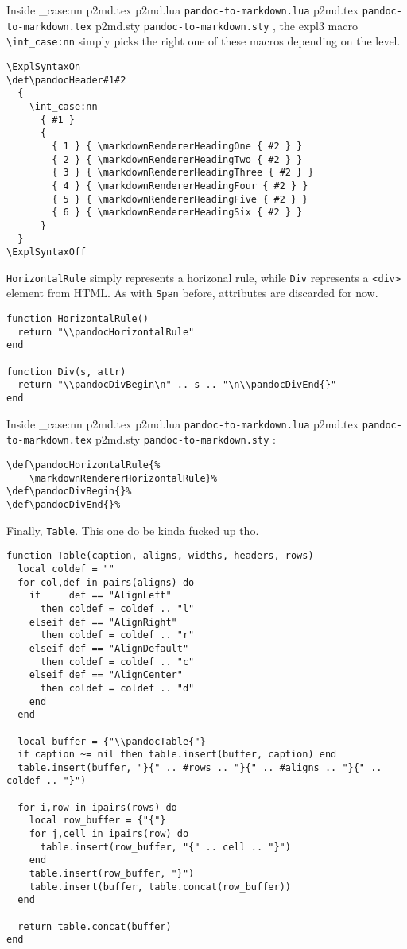 \documentclass[
  digital,     %
  oneside,     %
  nosansbold,  %
  nocolorbold, %
  lof,         %
  nolot,       %
]{fithesis4}
\newcommand\macro[1]{\texttt{\textbackslash{}{#1}}}
\newcommand\file[1]
  {
    \str_case:nn
      { #1 }
      {
        { p2md.lua } { \texttt{pandoc\hyp{}to\hyp{}markdown.lua} }
        { p2md.tex } { \texttt{pandoc\hyp{}to\hyp{}markdown.tex} }
        { p2md.sty } { \texttt{pandoc\hyp{}to\hyp{}markdown.sty} }
      }
  }
\begin{document}
\noindent
Inside \file{p2md.tex}, the expl3 macro \macro{int\_case:nn} simply picks the right one of these macros depending on the level.

\noindent
\lstset{language=[plain]TeX}
\begin{lstlisting}
\ExplSyntaxOn
\def\pandocHeader#1#2
  {
    \int_case:nn
      { #1 }
      {
        { 1 } { \markdownRendererHeadingOne { #2 } }
        { 2 } { \markdownRendererHeadingTwo { #2 } }
        { 3 } { \markdownRendererHeadingThree { #2 } }
        { 4 } { \markdownRendererHeadingFour { #2 } }
        { 5 } { \markdownRendererHeadingFive { #2 } }
        { 6 } { \markdownRendererHeadingSix { #2 } }
      }
  }
\ExplSyntaxOff
\end{lstlisting}

\noindent
\texttt{HorizontalRule} simply represents a horizonal rule, while \texttt{Div} represents a \texttt{<div>} element from HTML. As with \texttt{Span} before, attributes are discarded for now.

\noindent
\lstset{language=[5.3]Lua}
\begin{lstlisting}
function HorizontalRule()
  return "\\pandocHorizontalRule"
end

function Div(s, attr)
  return "\\pandocDivBegin\n" .. s .. "\n\\pandocDivEnd{}"
end
\end{lstlisting}

\noindent
Inside \file{p2md.tex}:

\noindent
\lstset{language=[plain]TeX}
\begin{lstlisting}
\def\pandocHorizontalRule{%
    \markdownRendererHorizontalRule}%
\def\pandocDivBegin{}%
\def\pandocDivEnd{}%
\end{lstlisting}

\noindent
Finally, \texttt{Table}. This one do be kinda fucked up tho.

\noindent
\lstset{language=[5.3]Lua}
\begin{lstlisting}
function Table(caption, aligns, widths, headers, rows)
  local coldef = ""
  for col,def in pairs(aligns) do
    if     def == "AlignLeft"
      then coldef = coldef .. "l"
    elseif def == "AlignRight"
      then coldef = coldef .. "r"
    elseif def == "AlignDefault"
      then coldef = coldef .. "c"
    elseif def == "AlignCenter"
      then coldef = coldef .. "d"
    end
  end

  local buffer = {"\\pandocTable{"}
  if caption ~= nil then table.insert(buffer, caption) end
  table.insert(buffer, "}{" .. #rows .. "}{" .. #aligns .. "}{" .. coldef .. "}")

  for i,row in ipairs(rows) do
    local row_buffer = {"{"}
    for j,cell in ipairs(row) do
      table.insert(row_buffer, "{" .. cell .. "}")
    end
    table.insert(row_buffer, "}")
    table.insert(buffer, table.concat(row_buffer))
  end

  return table.concat(buffer)
end
\end{lstlisting}
\end{document}
